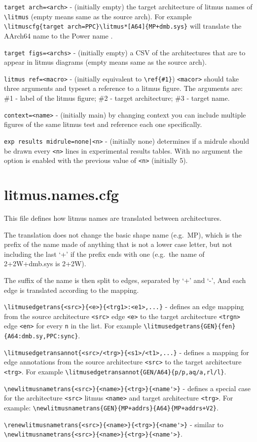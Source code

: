 \documentclass[a4paper]{article}
\begin{document}
\verb|target arch=<arch>| - (initially empty) the target architecture
of litmus names of \verb|\litmus| (empty means same as the source arch).
For example
\verb|\litmuscfg{target arch=PPC}\litmus*[A64]{MP+dmb.sys}|
will translate the AArch64 name  to the
Power name .

\verb|target figs=<archs>| - (initially empty) a CSV of the architectures
that are to appear in litmus diagrams (empty means same as the source arch).

\verb|litmus ref=<macro>| - (initially equivalent to \verb|\ref{#1}|)
\verb|<macor>| should take three arguments and typeset a reference to
a litmus figure. The arguments are: \#1 - label of the litmus figure;
\#2 - target architecture; \#3 - target name.

\verb|context=<name>| - (initially main) by changing context you can
include multiple figures of the same litmus test and reference each
one specifically.

\verb!exp results midrule=none|<n>! - (initially none) determines if a
midrule should be drawn every \verb|<n>| lines in experimental results
tables.
With no argument the option is enabled with the previous value of
\verb|<n>| (initially 5).

\section{litmus.names.cfg}
This file defines how litmus names are translated between architectures.

The translation does not change the basic shape name (e.g.\ MP), which
is the prefix of the name made of anything that is not a lower case
letter, but not including the last `+' if the prefix ends with one
(e.g.\ the name of 2+2W+dmb.sys is 2+2W).

The suffix of the name is then split to edges, separated by `+' and `-',
And each edge is translated according to the mapping.

\verb|\litmusedgetrans{<src>}{<e>}{<trg1>:<e1>,...}| - defines an
edge mapping from the source architecture \verb|<src>| edge \verb|<e>|
to the target architecture \verb|<trgn>| edge \verb|<en>| for every
\verb|n| in the list.
For example \verb|\litmusedgetrans{GEN}{fen}{A64:dmb.sy,PPC:sync}|.

\verb|\litmusedgetransannot{<src>/<trg>}{<s1>/<t1>,...}| - defines
a mapping for edge annotations from the source architecture \verb|<src>|
to the target architecture \verb|<trg>|.
For example \verb|\litmusedgetransannot{GEN/A64}{p/p,aq/a,rl/l}|.

\verb|\newlitmusnametrans{<src>}{<name>}{<trg>}{<name'>}| - defines a
special case for the architecture \verb|<src>| litmus \verb|<name>|
and target architecture \verb|<trg>|.
For example: \verb|\newlitmusnametrans{GEN}{MP+addrs}{A64}{MP+addrs+V2}|.

\verb|\renewlitmusnametrans{<src>}{<name>}{<trg>}{<name'>}| - similar to
\verb|\newlitmusnametrans{<src>}{<name>}{<trg>}{<name'>}|.


\cleardoublepage
\end{document}
